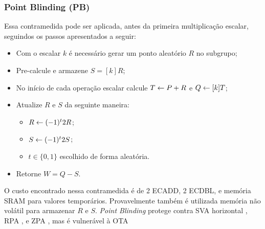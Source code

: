 \subsubsection{Point Blinding (PB)~\cite{Coron1999}}
Essa contramedida pode ser aplicada, antes da primeira multiplicação escalar, seguindos os passos apresentados a seguir: 
\begin{itemize}
    \item Com o escalar $k$ é necessário gerar um ponto aleatório $R$ no subgrupo;
    \item Pre-calcule e armazene $S = [k]R$;
    \item No início de cada operação escalar calcule $T \leftarrow P + R$ e $Q \leftarrow [k] T$;
    \item Atualize $R$ e $S$ da seguinte maneira:
    \begin{itemize}
        \item $R \leftarrow (-1)^t 2R$;
        \item $S \leftarrow (-1)^t 2S$;
        \item $t \in \{0,1\}$ escolhido de forma aleatória.
    \end{itemize}
    \item Retorne $W = Q - S$.
\end{itemize}

O custo encontrado nessa contramedida é de 2 ECADD, 2 ECDBL, e memória SRAM para valores temporários. Provavelmente também é utilizada memória não volátil para armazenar $R$ e $S$. \textit{Point Blinding} protege contra SVA horizontal \cite{MurdicaGuilley2012}, RPA \cite{Goubin2003}, e ZPA \cite{AkishitaTakagi2003}, mas é vulnerável à OTA \cite{BatinaChmielewski2014}

